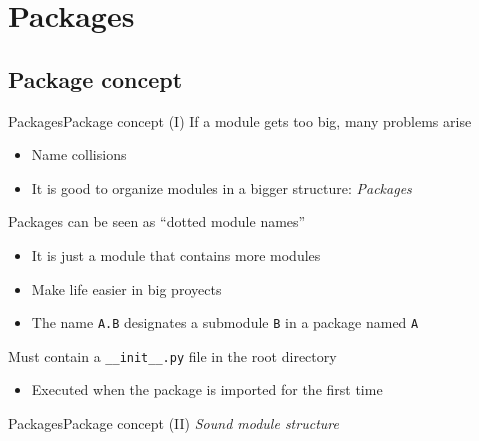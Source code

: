 \documentclass[10pt,compress]{beamer} %
\begin{document}
\section{Packages}
\subsection{Package concept}
\begin{frame}{Packages}{Package concept (I)}
		If a module gets too big, many problems arise
			\begin{itemize}
			\item Name collisions
			\item It is good to organize modules in a bigger structure: \textit{Packages}
			\end{itemize}
		Packages can be seen as ``dotted module names''
			\begin{itemize}
			\item It is just a module that contains more modules
			\item Make life easier in big proyects
			\item The name \texttt{A.B} designates a submodule \texttt{B} in a package named \texttt{A}
			\end{itemize}
		Must contain a \texttt{\_\_init\_\_.py} file in the root directory
			\begin{itemize}
			\item Executed when the package is imported for the first time
			\end{itemize}
\end{frame}

\begin{frame}{Packages}{Package concept (II)}
	\centering \textit{Sound module structure}
	
\end{frame}
\end{document}
